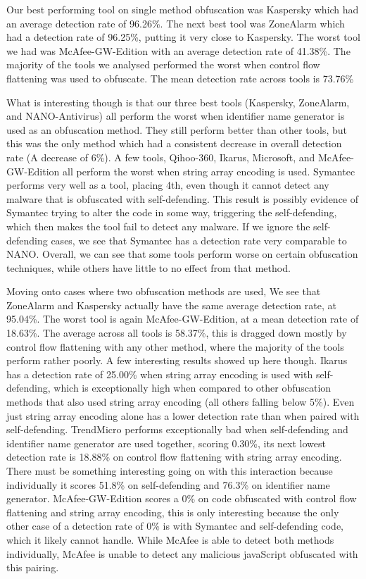 \documentclass[sigplan,10pt,review, nonacm=true]{acmart}\settopmatter{printfolios=true,printccs=false,printacmref=false}
\begin{document}
Our best performing tool on single method obfuscation was Kaspersky which had an average detection rate of 96.26\%. The next best tool was ZoneAlarm which had a detection rate of 96.25\%, putting it very close to Kaspersky. The worst tool we had was McAfee-GW-Edition with an average detection rate of 41.38\%. The majority of the tools we analysed performed the worst when control flow flattening was used to obfuscate. The mean detection rate across tools is 73.76\%

What is interesting though is that our three best tools (Kaspersky, ZoneAlarm, and NANO-Antivirus) all perform the worst when identifier name generator is used as an obfuscation method. They still perform better than other tools, but this was the only method which had a consistent decrease in overall detection rate (A decrease of 6\%). A few tools, Qihoo-360, Ikarus, Microsoft, and McAfee-GW-Edition all perform the worst when string array encoding is used. Symantec performs very well as a tool, placing 4th, even though it cannot detect any malware that is obfuscated with self-defending. This result is possibly evidence of Symantec trying to alter the code in some way, triggering the self-defending, which then makes the tool fail to detect any malware. If we ignore the self-defending cases, we see that Symantec has a detection rate very comparable to NANO. Overall, we can see that some tools perform worse on certain obfuscation techniques, while others have little to no effect from that method.

Moving onto cases where two obfuscation methods are used, We see that ZoneAlarm and Kaspersky actually have the same average detection rate, at 95.04\%. The worst tool is again McAfee-GW-Edition, at a mean detection rate of 18.63\%. The average across all tools is 58.37\%, this is dragged down mostly by control flow flattening with any other method, where the majority of the tools perform rather poorly. A few interesting results showed up here though. Ikarus has a detection rate of 25.00\% when string array encoding is used with self-defending, which is exceptionally high when compared to other obfuscation methods that also used string array encoding (all others falling below 5\%). Even just string array encoding alone has a lower detection rate than when paired with self-defending. TrendMicro performs exceptionally bad when self-defending and identifier name generator are used together, scoring 0.30\%, its next lowest detection rate is 18.88\% on control flow flattening with string array encoding. There must be something interesting going on with this interaction because individually it scores 51.8\% on self-defending and 76.3\% on identifier name generator. McAfee-GW-Edition scores a 0\% on code obfuscated with control flow flattening and string array encoding, this is only interesting because the only other case of a detection rate of 0\% is with Symantec and self-defending code, which it likely cannot handle. While McAfee is able to detect both methods individually, McAfee is unable to detect any malicious javaScript obfuscated with this pairing.
\end{document}

